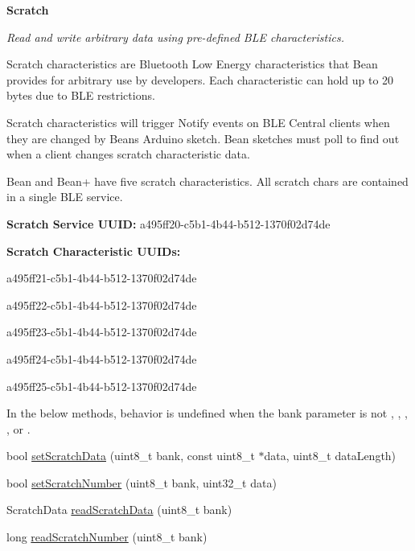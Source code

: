 \begin{Indent}{\bf Scratch}\par
{\em Read and write arbitrary data using pre-\/defined B\+LE characteristics.

Scratch characteristics are Bluetooth Low Energy characteristics that Bean provides for arbitrary use by developers. Each characteristic can hold up to 20 bytes due to B\+LE restrictions.

Scratch characteristics will trigger Notify events on B\+LE Central clients when they are changed by Bean\textquotesingle{}s Arduino sketch. Bean sketches must poll to find out when a client changes scratch characteristic data.

Bean and Bean+ have five scratch characteristics. All scratch chars are contained in a single B\+LE service.


\begin{DoxyItemize}
\item {\bfseries Scratch Service U\+U\+ID\+:} {\ttfamily a495ff20-\/c5b1-\/4b44-\/b512-\/1370f02d74de}
\item {\bfseries Scratch Characteristic U\+U\+I\+Ds\+:}
\begin{DoxyEnumerate}
\item {\ttfamily a495ff21-\/c5b1-\/4b44-\/b512-\/1370f02d74de}
\item {\ttfamily a495ff22-\/c5b1-\/4b44-\/b512-\/1370f02d74de}
\item {\ttfamily a495ff23-\/c5b1-\/4b44-\/b512-\/1370f02d74de}
\item {\ttfamily a495ff24-\/c5b1-\/4b44-\/b512-\/1370f02d74de}
\item {\ttfamily a495ff25-\/c5b1-\/4b44-\/b512-\/1370f02d74de}
\end{DoxyEnumerate}
\end{DoxyItemize}

In the below methods, behavior is undefined when the {\ttfamily bank} parameter is not {}, {}, {}, {}, or {}. }\begin{DoxyCompactItemize}
\item 
bool \hyperlink{class_bean_class_a6a8c9b33ada6cc7da1d9229dd0d7849e}{set\+Scratch\+Data} (uint8\+\_\+t bank, const uint8\+\_\+t $\ast$data, uint8\+\_\+t data\+Length)
\item 
bool \hyperlink{class_bean_class_a74e7107c64bec91d676cdd534ac6bb4d}{set\+Scratch\+Number} (uint8\+\_\+t bank, uint32\+\_\+t data)
\item 
Scratch\+Data \hyperlink{class_bean_class_af5b9029cc816e5ce21263be975aa6050}{read\+Scratch\+Data} (uint8\+\_\+t bank)
\item 
long \hyperlink{class_bean_class_a4c835abe680607ce956af4f7fa965a20}{read\+Scratch\+Number} (uint8\+\_\+t bank)
\end{DoxyCompactItemize}
\end{Indent}
